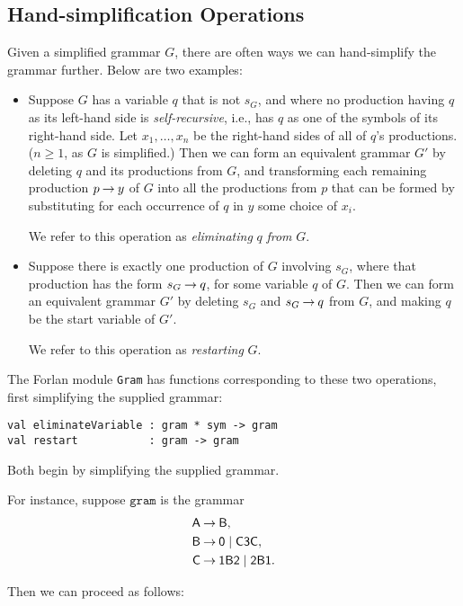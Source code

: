 \subsection{Hand-simplification Operations}

Given a simplified grammar $G$, there are often ways we can hand-simplify
the grammar further. Below are two examples:
\begin{itemize}
\item Suppose $G$ has a variable $q$ that is not $s_G$, and where no
  production having $q$ as its left-hand side is
  \emph{self-recursive}, i.e., has $q$ as one of the symbols of its
  right-hand side. Let $x_1,\ldots,x_n$ be the right-hand sides of all
  of $q$'s productions. ($n\geq 1$, as $G$ is simplified.)  Then we
  can form an equivalent grammar $G'$ by deleting $q$ and its
  productions from $G$, and transforming each remaining production
  $p\mathbin{\to} y$ of $G$ into all the productions from $p$ that can be
  formed by substituting for each occurrence of $q$ in $y$ some choice
  of $x_i$.

  We refer to this operation as \emph{eliminating} $q$ \emph{from}
  $G$.

\item Suppose there is exactly one production of $G$ involving $s_G$,
  where that production has the form $s_G\mathbin{\to} q$, for some variable
  $q$ of $G$. Then we can form an equivalent grammar $G'$ by deleting
  $s_G$ and $s_G\mathbin{\to} q$ from $G$, and making $q$ be the start variable
  of $G'$.

  We refer to this operation as \emph{restarting} $G$.
\end{itemize}

The Forlan module \texttt{Gram} has functions corresponding to these
two operations, first simplifying the supplied grammar:
\begin{verbatim}
val eliminateVariable : gram * sym -> gram
val restart           : gram -> gram
\end{verbatim}
Both begin by simplifying the supplied grammar.

For instance, suppose $\texttt{gram}$ is the grammar
\begin{align*}
\mathsf{A} &\mathbin{\to} \mathsf{B}, \\
\mathsf{B} &\mathbin{\to} \mathsf{0} \mid \mathsf{C}\mathsf{3}\mathsf{C} , \\
\mathsf{C} &\mathbin{\to} \mathsf{1}\mathsf{B}\mathsf{2} \mid \mathsf{2}\mathsf{B}\mathsf{1} .
\end{align*}

Then we can proceed as follows:


